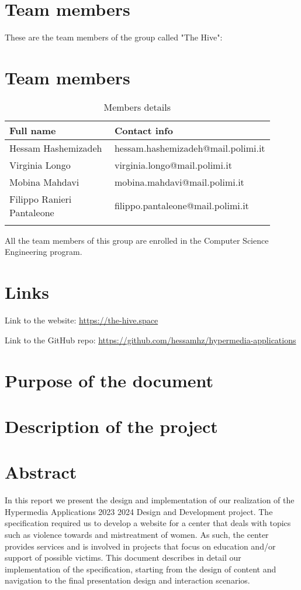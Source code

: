 \section{Team members}
These are the team members of the group called "The Hive":
\section{Team members}
\begin{longtable}
    {|m{0.4\linewidth}|m{0.5\linewidth}|}
            \hline
            \textbf{Full name} & \textbf{Contact info}\\
            \hline
            \endhead
                Hessam Hashemizadeh & hessam.hashemizadeh@mail.polimi.it \\
            \hline
                Virginia Longo & virginia.longo@mail.polimi.it \\
            \hline
                Mobina Mahdavi & mobina.mahdavi@mail.polimi.it \\
            \hline
                Filippo Ranieri Pantaleone & filippo.pantaleone@mail.polimi.it \\
            \hline
            \caption{Members details}
            \label{table:mem_details}
\end{longtable}

All the team members of this group are enrolled in the Computer Science Engineering program.

\section{Links}
Link to the website: \url{https://the-hive.space}

Link to the GitHub repo: \url{https://github.com/hessamhz/hypermedia-applications}

\section{Purpose of the document}

\section{Description of the project}

\section{Abstract}
In this report we present the design and implementation of our realization of the Hypermedia Applications 2023 2024 Design and Development project.
The specification required us to develop a website for a center that deals with topics such as violence towards and mistreatment of women. As such,
the center provides services and is involved in projects that focus on education and/or support of possible victims. This document describes in detail
our implementation of the specification, starting from the design of content and navigation to the final presentation design and interaction scenarios.
